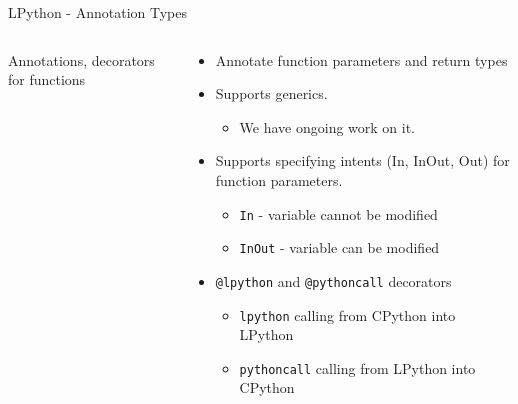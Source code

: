 \begin{frame}{LPython - Annotation Types}
    \begin{columns}
        \begin{column}{0.5\textwidth}
            \tiny
            
            \centering Annotations, decorators for functions
        \end{column}
        \begin{column}{0.5\textwidth}
            \begin{itemize}
                \item Annotate function parameters and return types
                \item Supports generics.
                \begin{itemize}
                    \item \scriptsize{We have ongoing work on it.}
                \end{itemize}
                \item Supports specifying intents (In, InOut, Out) for function parameters.
                \begin{itemize}
                    \item \scriptsize{\texttt{In} - variable cannot be modified}
                    \item \scriptsize{\texttt{InOut} - variable can be modified}
                \end{itemize}
                \item \texttt{@lpython} and \texttt{@pythoncall} decorators
                \begin{itemize}
                    \item \scriptsize \texttt{lpython} calling from CPython into LPython 
                    \item \scriptsize \texttt{pythoncall} calling from LPython into CPython
                \end{itemize}
            \end{itemize}
        \end{column}
    \end{columns}
\end{frame}
